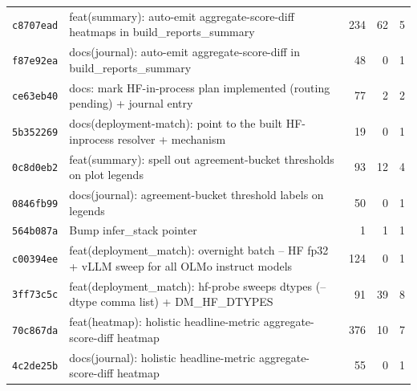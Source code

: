 \begin{longtable}{@{}p{}p{}r r r@{}}
\texttt{c8707ead} & feat(summary): auto-emit aggregate-score-diff heatmaps in build\_reports\_summary & 234 & 62 & 5 \\
\texttt{f87e92ea} & docs(journal): auto-emit aggregate-score-diff in build\_reports\_summary & 48 & 0 & 1 \\
\texttt{ce63eb40} & docs: mark HF-in-process plan implemented (routing pending) + journal entry & 77 & 2 & 2 \\
\texttt{5b352269} & docs(deployment-match): point to the built HF-inprocess resolver + mechanism & 19 & 0 & 1 \\
\texttt{0c8d0eb2} & feat(summary): spell out agreement-bucket thresholds on plot legends & 93 & 12 & 4 \\
\texttt{0846fb99} & docs(journal): agreement-bucket threshold labels on legends & 50 & 0 & 1 \\
\texttt{564b087a} & Bump infer\_stack pointer & 1 & 1 & 1 \\
\texttt{c00394ee} & feat(deployment\_match): overnight batch -- HF fp32 + vLLM sweep for all OLMo instruct models & 124 & 0 & 1 \\
\texttt{3ff73c5c} & feat(deployment\_match): hf-probe sweeps dtypes (--dtype comma list) + DM\_HF\_DTYPES & 91 & 39 & 8 \\
\texttt{70c867da} & feat(heatmap): holistic headline-metric aggregate-score-diff heatmap & 376 & 10 & 7 \\
\texttt{4c2de25b} & docs(journal): holistic headline-metric aggregate-score-diff heatmap & 55 & 0 & 1 \\
\bottomrule\end{longtable}
